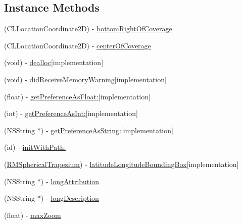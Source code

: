 \subsection*{Instance Methods}
\begin{DoxyCompactItemize}
\item 
(C\-L\-Location\-Coordinate2\-D) -\/ \hyperlink{interface_r_m_d_b_map_source_a93c3633372135b528cc2465edb7b2ecd}{bottom\-Right\-Of\-Coverage}
\item 
(C\-L\-Location\-Coordinate2\-D) -\/ \hyperlink{interface_r_m_d_b_map_source_a56ec33f7059e7bfd4ded67ce6d6971a1}{center\-Of\-Coverage}
\item 
(void) -\/ \hyperlink{interface_r_m_d_b_map_source_a739f11524bff4d182ff4156f209ab029}{dealloc}{\ttfamily  \mbox{[}implementation\mbox{]}}
\item 
(void) -\/ \hyperlink{interface_r_m_d_b_map_source_a83c3f614b33aa51be649f9964d001e52}{did\-Receive\-Memory\-Warning}{\ttfamily  \mbox{[}implementation\mbox{]}}
\item 
(float) -\/ \hyperlink{interface_r_m_d_b_map_source_a42fa2b709c1cb908cb3e4b7594eb169d}{get\-Preference\-As\-Float\-:}{\ttfamily  \mbox{[}implementation\mbox{]}}
\item 
(int) -\/ \hyperlink{interface_r_m_d_b_map_source_abea886f3d6661dacc03af2b30190743d}{get\-Preference\-As\-Int\-:}{\ttfamily  \mbox{[}implementation\mbox{]}}
\item 
(N\-S\-String $\ast$) -\/ \hyperlink{interface_r_m_d_b_map_source_a38e204b65e0108a40c9649639eee77a5}{get\-Preference\-As\-String\-:}{\ttfamily  \mbox{[}implementation\mbox{]}}
\item 
(id) -\/ \hyperlink{interface_r_m_d_b_map_source_a19700da6a28ccf4d7de998a8eccb6bbe}{init\-With\-Path\-:}
\item 
(\hyperlink{struct_r_m_spherical_trapezium}{R\-M\-Spherical\-Trapezium}) -\/ \hyperlink{interface_r_m_d_b_map_source_a417dd7478c35cc11637d15dbcff47306}{latitude\-Longitude\-Bounding\-Box}{\ttfamily  \mbox{[}implementation\mbox{]}}
\item 
(N\-S\-String $\ast$) -\/ \hyperlink{interface_r_m_d_b_map_source_a8b7afccf2f64bd7f76e6ea093f765304}{long\-Attribution}
\item 
(N\-S\-String $\ast$) -\/ \hyperlink{interface_r_m_d_b_map_source_ae84c5c1f8b2d261ac0e148b43bcd17af}{long\-Description}
\item 
(float) -\/ \hyperlink{interface_r_m_d_b_map_source_a433624a4955d93aa353cf47c971243e2}{max\-Zoom}
\item 

\end{DoxyCompactItemize}
